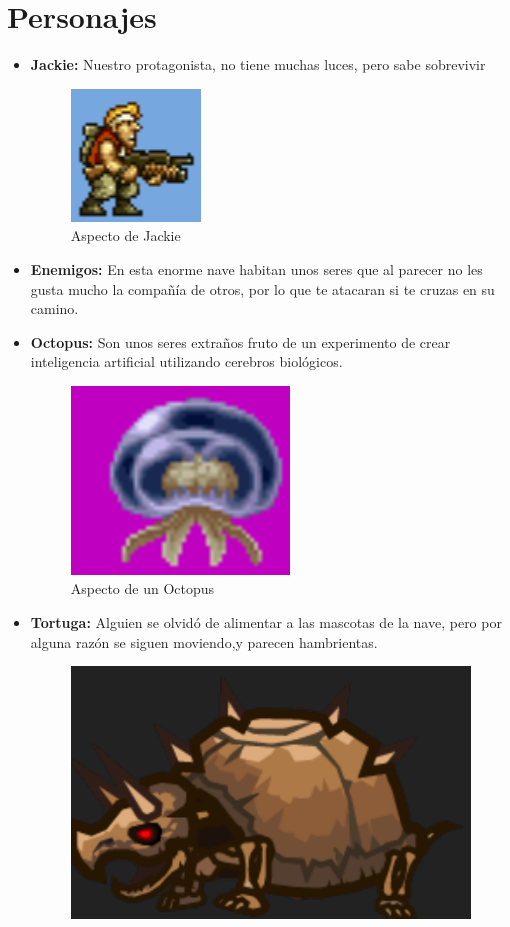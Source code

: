 \section{Personajes}
\begin{itemize}
	\item \textbf{Jackie:} Nuestro protagonista, no tiene muchas luces, pero sabe sobrevivir
	\begin{figure}[H]
		\centering
		\includegraphics[scale=0.95]{imagenes/personaje_1.png}	
		\caption{\label{fig:Jackie} Aspecto de Jackie}
	\end{figure}
	\item \textbf{Enemigos:} En esta enorme nave habitan unos seres que al parecer no les gusta mucho la compañía de otros, por lo que te atacaran si te cruzas en su camino.
	\item \textbf{Octopus:} Son unos seres extraños fruto de un experimento de crear inteligencia artificial utilizando cerebros biológicos. 
	\begin{figure}[H]
		\centering
		\includegraphics[scale=0.95]{imagenes/octopus.png}	
		\caption{\label{fig:Octopus}Aspecto de un Octopus}
	\end{figure}
	\item \textbf{Tortuga:} Alguien se olvidó de alimentar a las mascotas de la nave, pero por alguna razón se siguen moviendo,y parecen hambrientas. 
	\begin{figure}[H]
		\centering
		\includegraphics[scale=0.60]{imagenes/tortuga.png}	

\end{figure}
\end{itemize}
